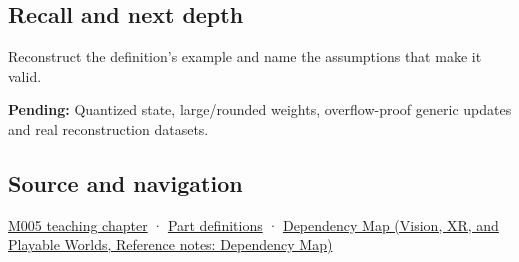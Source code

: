\subsection{Recall and next depth}\label{appendix-260182e617b7-recall-and-next-depth}

Reconstruct the definition's example and name the assumptions that make it valid.

\textbf{Pending:} Quantized state, large/rounded weights, overflow-proof generic updates and real reconstruction datasets.

\subsection{Source and navigation}\label{appendix-260182e617b7-source-and-navigation}

\hyperref[01-foundations-i-ch001-when-arithmetic-meets-uncertainty]{M005 teaching chapter} · \hyperref[appendix-fd090d982a15-m005---parts-77-88]{Part definitions} · \href{../07-Vision-XR-and-Playable-Worlds/main.pdf\#nameddest=appendix-4ad47bdd269a}{Dependency Map (Vision, XR, and Playable Worlds, Reference notes: Dependency Map)}

